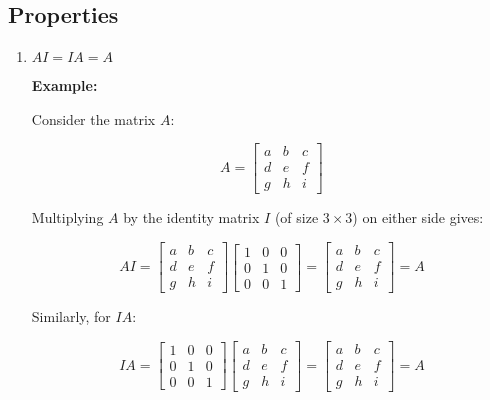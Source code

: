 \documentclass{article}
\begin{document}
\subsection{Properties}
\begin{enumerate}
    \item \( AI = IA = A \)
    
    \textbf{Example:}
    
    Consider the matrix \( A \):
    
    \[
    A = \begin{bmatrix}
    a & b & c \\
    d & e & f \\
    g & h & i
    \end{bmatrix}
    \]
    
    Multiplying \( A \) by the identity matrix \( I \) (of size \( 3 \times 3 \)) on either side gives:
    
    \[
    AI = \begin{bmatrix}
    a & b & c \\
    d & e & f \\
    g & h & i
    \end{bmatrix}
    \begin{bmatrix}
    1 & 0 & 0 \\
    0 & 1 & 0 \\
    0 & 0 & 1
    \end{bmatrix}
    = \begin{bmatrix}
    a & b & c \\
    d & e & f \\
    g & h & i
    \end{bmatrix}
    = A
    \]
    
    Similarly, for \( IA \):
    
    \[
    IA = \begin{bmatrix}
    1 & 0 & 0 \\
    0 & 1 & 0 \\
    0 & 0 & 1
    \end{bmatrix}
    \begin{bmatrix}
    a & b & c \\
    d & e & f \\
    g & h & i
    \end{bmatrix}
    = \begin{bmatrix}
    a & b & c \\
    d & e & f \\
    g & h & i
    \end{bmatrix}
    = A
    \]
\end{enumerate}
\end{document}
